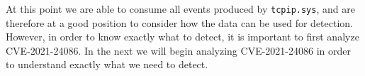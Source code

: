 \documentclass{report}
\begin{document}
At this point we are able to consume all events produced by \texttt{tcpip.sys}, and are therefore at a good position to consider how the data can be used for detection. However, in order to know exactly what to detect, it is important to first analyze CVE-2021-24086. In the next  we will begin analyzing CVE-2021-24086 in order to understand exactly what we need to detect.
\end{document}
